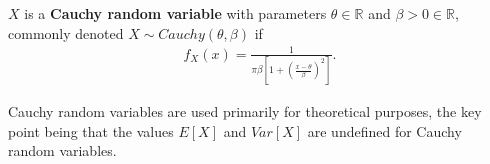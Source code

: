 \documentclass[12pt]{article}
\newcommand{\mb}{\mathbb}
\newcommand{\R}{\mb{R}}
\newcommand{\<}{\langle}
\renewcommand{\>}{\rangle}
\begin{document}
$X$ is a \textbf{Cauchy random variable} with parameters $\theta\in\R$ and $\beta>0\in\R$, commonly denoted $X\sim Cauchy(\theta,\beta)$ if 
\begin{align*}
f_X(x)=\frac{1}{\pi\beta[1+(\frac{x-\theta}{\beta})^2]}.
\end{align*}

Cauchy random variables are used primarily for theoretical purposes, the key point being that the values $E[X]$ and $Var[X]$ are undefined for Cauchy random variables.
\end{document}
